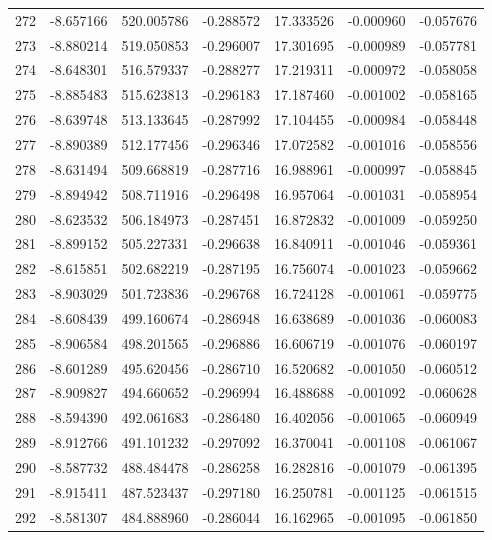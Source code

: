 \begin{tabular}{rrrrrrr}
 272 &  -8.657166 &  520.005786 & -0.288572 &   17.333526 &   -0.000960 & -0.057676 \\
 273 &  -8.880214 &  519.050853 & -0.296007 &   17.301695 &   -0.000989 & -0.057781 \\
 274 &  -8.648301 &  516.579337 & -0.288277 &   17.219311 &   -0.000972 & -0.058058 \\
 275 &  -8.885483 &  515.623813 & -0.296183 &   17.187460 &   -0.001002 & -0.058165 \\
 276 &  -8.639748 &  513.133645 & -0.287992 &   17.104455 &   -0.000984 & -0.058448 \\
 277 &  -8.890389 &  512.177456 & -0.296346 &   17.072582 &   -0.001016 & -0.058556 \\
 278 &  -8.631494 &  509.668819 & -0.287716 &   16.988961 &   -0.000997 & -0.058845 \\
 279 &  -8.894942 &  508.711916 & -0.296498 &   16.957064 &   -0.001031 & -0.058954 \\
 280 &  -8.623532 &  506.184973 & -0.287451 &   16.872832 &   -0.001009 & -0.059250 \\
 281 &  -8.899152 &  505.227331 & -0.296638 &   16.840911 &   -0.001046 & -0.059361 \\
 282 &  -8.615851 &  502.682219 & -0.287195 &   16.756074 &   -0.001023 & -0.059662 \\
 283 &  -8.903029 &  501.723836 & -0.296768 &   16.724128 &   -0.001061 & -0.059775 \\
 284 &  -8.608439 &  499.160674 & -0.286948 &   16.638689 &   -0.001036 & -0.060083 \\
 285 &  -8.906584 &  498.201565 & -0.296886 &   16.606719 &   -0.001076 & -0.060197 \\
 286 &  -8.601289 &  495.620456 & -0.286710 &   16.520682 &   -0.001050 & -0.060512 \\
 287 &  -8.909827 &  494.660652 & -0.296994 &   16.488688 &   -0.001092 & -0.060628 \\
 288 &  -8.594390 &  492.061683 & -0.286480 &   16.402056 &   -0.001065 & -0.060949 \\
 289 &  -8.912766 &  491.101232 & -0.297092 &   16.370041 &   -0.001108 & -0.061067 \\
 290 &  -8.587732 &  488.484478 & -0.286258 &   16.282816 &   -0.001079 & -0.061395 \\
 291 &  -8.915411 &  487.523437 & -0.297180 &   16.250781 &   -0.001125 & -0.061515 \\
 292 &  -8.581307 &  484.888960 & -0.286044 &   16.162965 &   -0.001095 & -0.061850 \\

\end{tabular}
